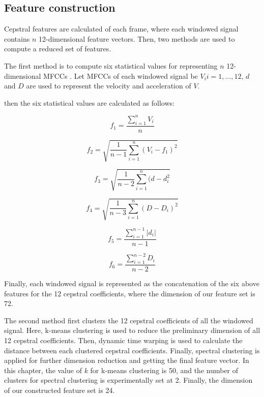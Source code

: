 \subsection{Feature construction}

Cepstral features are calculated of each frame, where each windowed signal contains $n$ 12-dimensional feature vectors. Then, two methods are used to compute a reduced set of features. 

The first method is to compute six statistical values for representing $n$ 12-dimensional MFCCs \citep{dufour2013clusterized}. Let MFCCs of each windowed signal be $V_{i}{i=1,...,12}$, $d$ and $D$ are used to represent the velocity and acceleration of $V$.


then the six statistical values are calculated as follows:

\begin{equation}
f_{1} = \frac{\sum_{i=1}^{n}V_{i}}{n}
\end{equation}

 
 \begin{equation}
 f_{2} = \sqrt{\frac{1}{n-1}\sum_{i=1}^{n}(V_{i}-f_{1})^{2}}
 \end{equation}


\begin{equation}
f_{3} = \sqrt{\frac{1}{n-2}\sum_{i=1}^{n}(d-d_{i}^{2}}
\end{equation}


\begin{equation}
f_{4} = \sqrt{\frac{1}{n-3}\sum_{i=1}^{n}(D-D_{i})^{2}}
\end{equation}



\begin{equation}
f_{5} = \frac{\sum_{i=1}^{n-1}|d_{i}|}{n-1}
\end{equation}


\begin{equation}
f_{6} = \frac{\sum_{i=1}^{n-2}D_{i}}{n-2}
\end{equation}


Finally, each windowed signal is represented as the concatenation of the six above features for the 12 cepstral coefficients, where the dimension of our feature set is 72.


The second method first clusters the 12 cepstral coefficients of all the windowed signal. Here, k-means clustering is used to reduce the preliminary dimension of all 12 cepstral coefficients. 
Then, dynamic time warping is used to calculate the distance between each clustered cepstral coefficients. Finally, spectral clustering is applied for further dimension reduction and getting the final feature vector. In this chapter, the value of $k$ for k-means clustering is 50, and the number of clusters for spectral clustering is experimentally set at 2. Finally, the dimension of our constructed feature set is 24.


